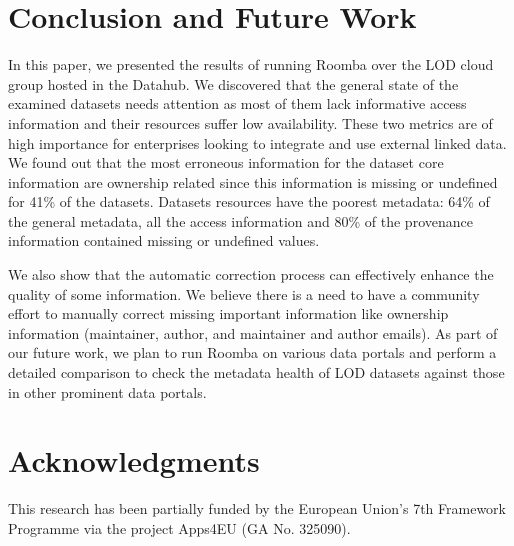 \documentclass[runningheads,a4paper]{../../Util/LaTEX/llncs}
\begin{document}
\section{Conclusion and Future Work}
\label{sec:conclusion}
In this paper, we presented the results of running Roomba over the LOD cloud group hosted in the Datahub. We discovered that the general state of the examined datasets needs attention as most of them lack informative access information and their resources suffer low availability. These two metrics are of high importance for enterprises looking to integrate and use external linked data. We found out that the most erroneous information for the dataset core information are ownership related since this information is missing or undefined for 41\% of the datasets. Datasets resources have the poorest metadata: 64\% of the general metadata, all the access information and 80\% of the provenance information contained missing or undefined values.

We also show that the automatic correction process can effectively enhance the quality of some information. We believe there is a need to have a community effort to manually correct missing important information like ownership information (maintainer, author, and maintainer and author emails). As part of our future work, we plan to run Roomba on various data portals and perform a detailed comparison to check the metadata health of LOD datasets against those in other prominent data portals.


\section*{Acknowledgments}
This research has been partially funded by the European Union's 7th Framework Programme via the project Apps4EU (GA No. 325090).


\nocite{*}

\end{document}
